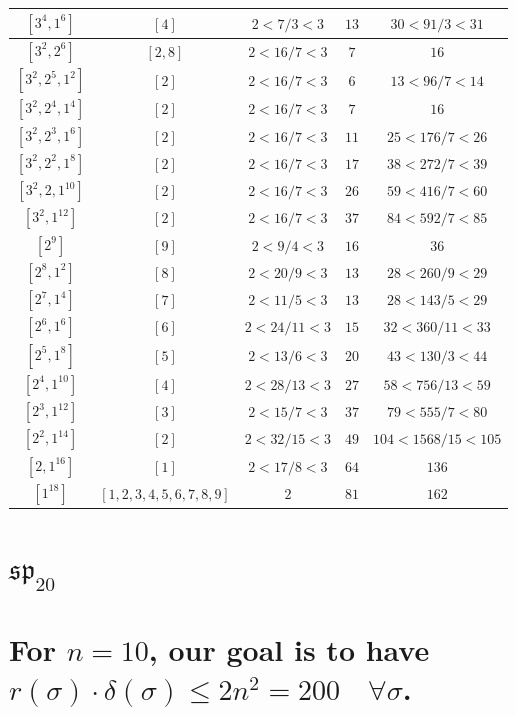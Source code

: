 \documentclass{article}%
\begin{document}
\begin{center}
\begin{longtable}{||c|c|c|c|c||}
$[3^{4}, 1^{6}]$ & $[4]$ & $2 < 7/3 < 3$ & $13$ & $30 < 91/3 < 31$ \\ \hline 
$[3^{2}, 2^{6}]$ & $[2, 8]$ & $2 < 16/7 < 3$ & $7$ & $16$ \\ \hline 
$[3^{2}, 2^{5}, 1^{2}]$ & $[2]$ & $2 < 16/7 < 3$ & $6$ & $13 < 96/7 < 14$ \\ \hline 
$[3^{2}, 2^{4}, 1^{4}]$ & $[2]$ & $2 < 16/7 < 3$ & $7$ & $16$ \\ \hline 
$[3^{2}, 2^{3}, 1^{6}]$ & $[2]$ & $2 < 16/7 < 3$ & $11$ & $25 < 176/7 < 26$ \\ \hline 
$[3^{2}, 2^{2}, 1^{8}]$ & $[2]$ & $2 < 16/7 < 3$ & $17$ & $38 < 272/7 < 39$ \\ \hline 
$[3^{2}, 2, 1^{10}]$ & $[2]$ & $2 < 16/7 < 3$ & $26$ & $59 < 416/7 < 60$ \\ \hline 
$[3^{2}, 1^{12}]$ & $[2]$ & $2 < 16/7 < 3$ & $37$ & $84 < 592/7 < 85$ \\ \hline 
$[2^{9}]$ & $[9]$ & $2 < 9/4 < 3$ & $16$ & $36$ \\ \hline 
$[2^{8}, 1^{2}]$ & $[8]$ & $2 < 20/9 < 3$ & $13$ & $28 < 260/9 < 29$ \\ \hline 
$[2^{7}, 1^{4}]$ & $[7]$ & $2 < 11/5 < 3$ & $13$ & $28 < 143/5 < 29$ \\ \hline 
$[2^{6}, 1^{6}]$ & $[6]$ & $2 < 24/11 < 3$ & $15$ & $32 < 360/11 < 33$ \\ \hline 
$[2^{5}, 1^{8}]$ & $[5]$ & $2 < 13/6 < 3$ & $20$ & $43 < 130/3 < 44$ \\ \hline 
$[2^{4}, 1^{10}]$ & $[4]$ & $2 < 28/13 < 3$ & $27$ & $58 < 756/13 < 59$ \\ \hline 
$[2^{3}, 1^{12}]$ & $[3]$ & $2 < 15/7 < 3$ & $37$ & $79 < 555/7 < 80$ \\ \hline 
$[2^{2}, 1^{14}]$ & $[2]$ & $2 < 32/15 < 3$ & $49$ & $104 < 1568/15 < 105$ \\ \hline 
$[2, 1^{16}]$ & $[1]$ & $2 < 17/8 < 3$ & $64$ & $136$ \\ \hline 
$[1^{18}]$ & $[1, 2, 3, 4, 5, 6, 7, 8, 9]$ & $2$ & $81$ & $162$ \\ \hline 
    \end{longtable}
    \end{center}
\newpage

%
\section{$\mathfrak{sp}_{20}$}%
\section*{For $n=10$, our goal is to have $r(\sigma) \cdot \delta(\sigma) \leq 2n^2 = 200 \quad \forall \sigma$.}%
\end{document}
